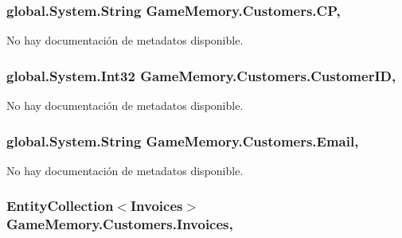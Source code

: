\hypertarget{class_game_memory_1_1_customers_ad3e8ea3edca56d457e165112a75a27df}{
\subsubsection[{C\-P}]{\setlength{\rightskip}{0pt plus 5cm}global.\-System.\-String Game\-Memory.\-Customers.\-C\-P\hspace{0.3cm}{\ttfamily [get]}, {\ttfamily [set]}}}\label{class_game_memory_1_1_customers_ad3e8ea3edca56d457e165112a75a27df}


No hay documentación de metadatos disponible. 

\hypertarget{class_game_memory_1_1_customers_a7b78aa9b1df1d99f6a58dbf25abc0590}{
\subsubsection[{Customer\-I\-D}]{\setlength{\rightskip}{0pt plus 5cm}global.\-System.\-Int32 Game\-Memory.\-Customers.\-Customer\-I\-D\hspace{0.3cm}{\ttfamily [get]}, {\ttfamily [set]}}}\label{class_game_memory_1_1_customers_a7b78aa9b1df1d99f6a58dbf25abc0590}


No hay documentación de metadatos disponible. 

\hypertarget{class_game_memory_1_1_customers_a37a6087319b6594adbec2b27b820d0ea}{
\subsubsection[{Email}]{\setlength{\rightskip}{0pt plus 5cm}global.\-System.\-String Game\-Memory.\-Customers.\-Email\hspace{0.3cm}{\ttfamily [get]}, {\ttfamily [set]}}}\label{class_game_memory_1_1_customers_a37a6087319b6594adbec2b27b820d0ea}


No hay documentación de metadatos disponible. 

\hypertarget{class_game_memory_1_1_customers_a6348f6d374057879900c399c52a57f02}{
\subsubsection[{Invoices}]{\setlength{\rightskip}{0pt plus 5cm}Entity\-Collection$<${\bf Invoices}$>$ Game\-Memory.\-Customers.\-Invoices\hspace{0.3cm}{\ttfamily [get]}, {\ttfamily [set]}}}\label{class_game_memory_1_1_customers_a6348f6d374057879900c399c52a57f02}


